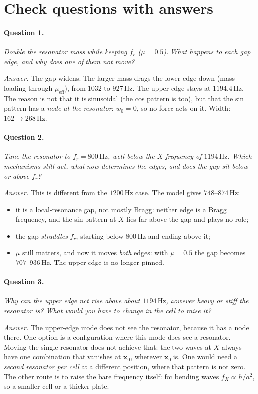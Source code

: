 \section{Check questions with answers}

\paragraph{Question 1.} \emph{Double the resonator mass while keeping $f_r$
($\mu = 0.5$). What happens to each gap edge, and why does one of them not move?}

\emph{Answer.} The gap widens. The larger mass drags the lower edge down
(mass loading through $\mu_\mathrm{eff}$), from $1032$ to $927\,\mathrm{Hz}$. The
upper edge stays at $1194.4\,\mathrm{Hz}$. The reason is not that it is
sinusoidal (the cos pattern is too), but that the sin pattern has a \emph{node at
the resonator}: $w_0 = 0$, so no force acts on it. Width: $162 \to 268\,\mathrm{Hz}$.

\paragraph{Question 2.} \emph{Tune the resonator to $f_r = 800\,\mathrm{Hz}$, well
below the $X$ frequency of $1194\,\mathrm{Hz}$. Which mechanisms still act, what
now determines the edges, and does the gap sit below or above $f_r$?}

\emph{Answer.} This is different from the $1200\,\mathrm{Hz}$ case. The model
gives $748$--$874\,\mathrm{Hz}$:
\begin{itemize}
  \item it is a local-resonance gap, not mostly Bragg: neither edge is a Bragg
        frequency, and the sin pattern at $X$ lies far above the gap and plays no
        role;
  \item the gap \emph{straddles} $f_r$, starting below $800\,\mathrm{Hz}$ and
        ending above it;
  \item $\mu$ still matters, and now it moves \emph{both} edges: with
        $\mu = 0.5$ the gap becomes $707$--$936\,\mathrm{Hz}$. The upper edge is
        no longer pinned.
\end{itemize}

\paragraph{Question 3.} \emph{Why can the upper edge not rise above about
$1194\,\mathrm{Hz}$, however heavy or stiff the resonator is? What would you have
to change in the cell to raise it?}

\emph{Answer.} The upper-edge mode does not see the resonator, because it has a
node there. One option is a configuration where this mode does see a resonator.
Moving the single resonator does not achieve that: the two waves at $X$ always
have one combination that vanishes at $\mathbf{x}_0$, wherever $\mathbf{x}_0$ is.
One would need a \emph{second resonator per cell} at a different position, where
that pattern is not zero. The other route is to raise the bare frequency itself:
for bending waves $f_X \propto h/a^2$, so a smaller cell or a thicker plate.
